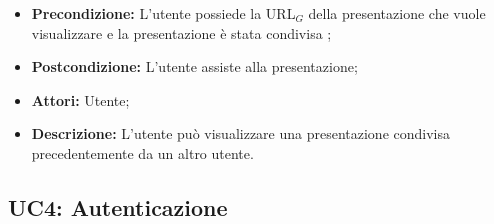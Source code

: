 \begin{itemize}
	\item \textbf{Precondizione:} L'utente possiede la URL$_G$ della presentazione che vuole visualizzare e la presentazione è stata condivisa ;
	\item \textbf{Postcondizione:} L'utente assiste alla presentazione;
	\item \textbf{Attori:} Utente;
	\item \textbf{Descrizione:} L'utente può visualizzare una presentazione condivisa precedentemente da un altro utente.
\end{itemize}
\subsection{ UC4: Autenticazione}

